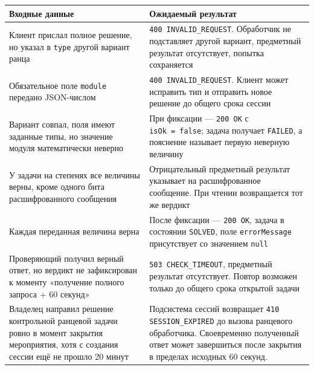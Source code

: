 \documentclass[12pt,a4paper]{article}
\begin{document}
{\def\LTcaptype{none} %
\begin{longtable}[]{@{}
  >{\raggedright\arraybackslash}p{}
  >{\raggedright\arraybackslash}p{}@{}}
\toprule\noalign{}
\begin{minipage}[b]{\linewidth}\raggedright
Входные данные
\end{minipage} & \begin{minipage}[b]{\linewidth}\raggedright
Ожидаемый результат
\end{minipage} \\
\midrule\noalign{}
\endhead
\bottomrule\noalign{}
\endlastfoot
Клиент прислал полное решение, но указал в \texttt{type} другой вариант ранца & \texttt{400 INVALID\_\allowbreak{}REQUEST}. Обработчик не подставляет другой вариант, предметный результат отсутствует, попытка сохраняется \\
Обязательное поле \texttt{module} передано JSON-числом & \texttt{400 INVALID\_\allowbreak{}REQUEST}. Клиент может исправить тип и отправить новое решение до общего срока сессии \\
Вариант совпал, поля имеют заданные типы, но значение модуля математически неверно & При фиксации --- \texttt{200\ OK} с \texttt{isOk\ =\ false}; задача получает \texttt{FAILED}, а пояснение называет первую неверную величину \\
У задачи на степенях все величины верны, кроме одного бита расшифрованного сообщения & Отрицательный предметный результат указывает на расшифрованное сообщение. При чтении возвращается тот же вердикт \\
Каждая переданная величина верна & После фиксации --- \texttt{200\ OK}, задача в состоянии \texttt{SOLVED}, поле \texttt{errorMessage} присутствует со значением \texttt{null} \\
Проверяющий получил верный ответ, но вердикт не зафиксирован к моменту «получение полного запроса + 60 секунд» & \texttt{503 CHECK\_\allowbreak{}TIMEOUT}, предметный результат отсутствует. Повтор возможен только до общего срока открытой задачи \\
Владелец направил решение контрольной ранцевой задачи ровно в момент закрытия мероприятия, хотя с создания сессии ещё не прошло 20 минут & Подсистема сессий возвращает \texttt{410 SESSION\_\allowbreak{}EXPIRED} до вызова ранцевого обработчика. Своевременно полученный ответ может завершиться после закрытия в пределах исходных 60 секунд. \\
\end{longtable}
}
\end{document}
